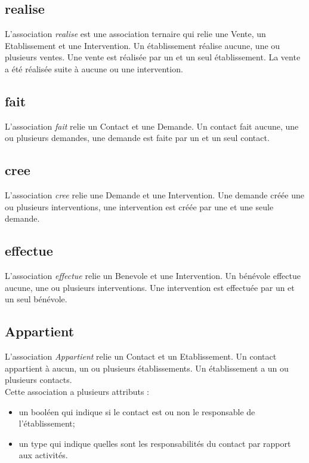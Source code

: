 \documentclass[asi, sansVersion]{picInsa}
\begin{document}
\subsection*{realise}

L'association \textit{realise} est une association ternaire qui relie une Vente, un Etablissement et une Intervention. Un établissement réalise aucune, une ou plusieurs ventes. Une vente est réalisée par un et un seul établissement. La vente a été réalisée suite à aucune ou une intervention.

\subsection*{fait}

L'association \textit{fait} relie un Contact et une Demande. Un contact fait aucune, une ou plusieurs demandes, une demande est faite par un et un seul contact.

\subsection*{cree}

L'association \textit{cree} relie une Demande et une Intervention. Une demande créée une ou plusieurs interventions, une intervention est créée par une et une seule demande.

\subsection*{effectue} 

L'association \textit{effectue} relie un Benevole et une Intervention. Un bénévole effectue aucune, une ou plusieurs interventions. Une intervention est effectuée par un et un seul bénévole. 

\subsection*{Appartient}

L'association \textit{Appartient} relie un Contact et un Etablissement. Un contact appartient à aucun, un ou plusieurs établissements. Un établissement a un ou plusieurs contacts.\\
Cette association a plusieurs attributs :
\begin{itemize}
\item un booléen qui indique si le contact est ou non le responsable de l'établissement; 
\item un type qui indique quelles sont les responsabilités du contact par rapport aux activités.
\end{itemize}
\end{document}
